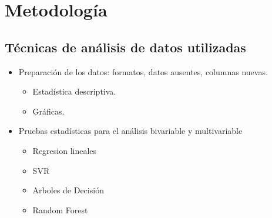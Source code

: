 \documentclass[a4paper,12pt]{article}
\begin{document}
\section{Metodología}
\subsection{Técnicas de análisis de datos utilizadas}

\begin{itemize}[label=\textbullet] %
  \item Preparación de los datos: formatos, datos ausentes, columnas nuevas.
        \begin{itemize}
          \item Estadística descriptiva.
          \item Gráficas.
        \end{itemize}
  \item Pruebas estadísticas para el análisis bivariable y multivariable
        \begin{itemize}
          \item Regresion lineales
          \item SVR
          \item Arboles de Decisión
          \item Random Forest
        \end{itemize}
\end{itemize}
\end{document}
